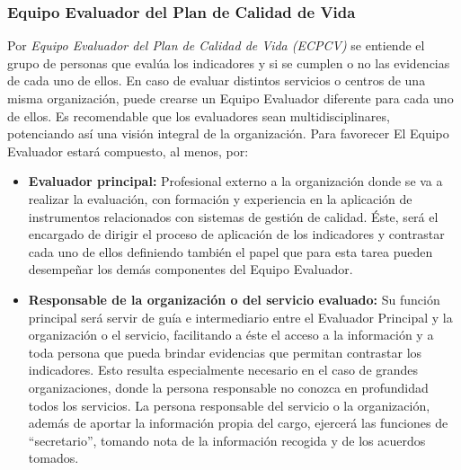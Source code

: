 \subsubsection{Equipo Evaluador del Plan de Calidad de Vida}
Por \textit{Equipo Evaluador del Plan de Calidad de Vida (ECPCV)} se entiende el
grupo de personas que evalúa los indicadores y si se cumplen o no las evidencias
de cada uno de ellos. En caso de evaluar distintos servicios o centros de una
misma organización, puede crearse un Equipo Evaluador diferente para cada uno de
ellos. Es recomendable que los evaluadores sean multidisciplinares, potenciando
así una visión integral de la organización. Para favorecer El Equipo Evaluador
estará compuesto, al menos, por:
\begin{itemize}
	\item \textbf{Evaluador principal: }Profesional externo a la organización
	donde se va a realizar la evaluación, con formación y experiencia en la
	aplicación de instrumentos relacionados con sistemas de gestión de calidad.
	Éste, será el encargado de dirigir el proceso de aplicación de los
	indicadores y contrastar cada uno de ellos definiendo también el papel que
	para esta tarea pueden desempeñar los demás componentes del Equipo
	Evaluador.
	\item \textbf{Responsable de la organización o del servicio evaluado: }Su
	función principal será servir de guía e intermediario entre el Evaluador
	Principal y la organización o el servicio, facilitando a éste el acceso a la
	información y a toda persona que pueda brindar evidencias que permitan
	contrastar los indicadores. Esto resulta especialmente necesario en el caso
	de grandes organizaciones, donde la persona responsable no conozca en
	profundidad todos los servicios. La persona responsable del servicio o la
	organización, además de aportar la información propia del cargo, ejercerá
	las funciones de “secretario”, tomando nota de la información recogida y de
	los acuerdos tomados. 
	

\end{itemize}
